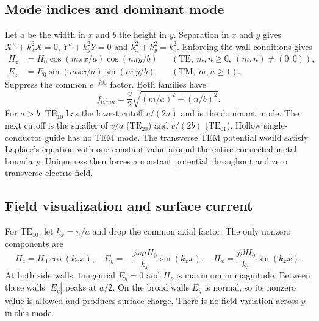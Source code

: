\documentclass[12pt,a4paper]{article}
\begin{document}
\subsection{Mode indices and dominant mode}
Let $a$ be the width in $x$ and $b$ the height in $y$. Separation in $x$ and $y$ gives $X''+k_x^2X=0$, $Y''+k_y^2Y=0$ and $k_x^2+k_y^2=k_c^2$. Enforcing the wall conditions gives
\[
\begin{aligned}
H_z&=H_0\cos(m\pi x/a)\cos(n\pi y/b)
 &&(\mathrm{TE},\ m,n\ge0,\ (m,n)\ne(0,0)),\\
E_z&=E_0\sin(m\pi x/a)\sin(n\pi y/b)
 &&(\mathrm{TM},\ m,n\ge1).
\end{aligned}
\]
Suppress the common $e^{-j\beta z}$ factor. Both families have
\[
 f_{c,mn}=\frac{v}{2}\sqrt{(m/a)^2+(n/b)^2}.
\]
For $a>b$, $\mathrm{TE}_{10}$ has the lowest cutoff $v/(2a)$ and is the dominant mode. The next cutoff is the smaller of $v/a$ ($\mathrm{TE}_{20}$) and $v/(2b)$ ($\mathrm{TE}_{01}$). Hollow single-conductor guide has no TEM mode. The transverse TEM potential would satisfy Laplace's equation with one constant value around the entire connected metal boundary. Uniqueness then forces a constant potential throughout and zero transverse electric field.
\subsection{Field visualization and surface current}
For $\mathrm{TE}_{10}$, let $k_x=\pi/a$ and drop the common axial factor. The only nonzero components are
\[
 H_z=H_0\cos(k_xx),\quad
 E_y=-\frac{j\omega\mu H_0}{k_x}\sin(k_xx),\quad
 H_x=\frac{j\beta H_0}{k_x}\sin(k_xx).
\]
At both side walls, tangential $E_y=0$ and $H_z$ is maximum in magnitude. Between these walls $|E_y|$ peaks at $a/2$. On the broad walls $E_y$ is normal, so its nonzero value is allowed and produces surface charge. There is no field variation across $y$ in this mode.
\begin{tcolorbox}[tikzbox,title={Electric field across the dominant-mode cross-section},unbreakable]
\centering
{}
\end{tcolorbox}
\end{document}
